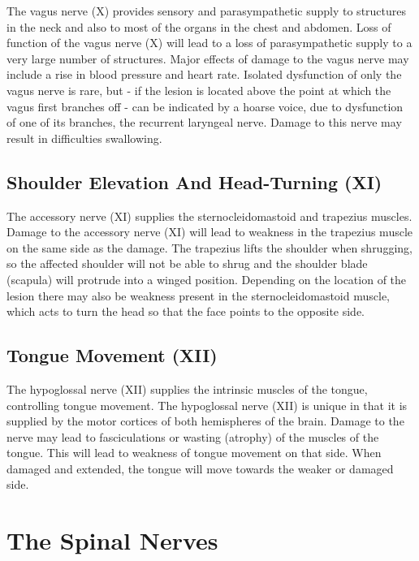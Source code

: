 \documentclass[]{book}
\begin{document}
The vagus nerve (X) provides sensory and parasympathetic supply to structures in the neck and also to most of the organs in the chest and abdomen. Loss of function of the vagus nerve (X) will lead to a loss of parasympathetic supply to a very large number of structures. Major effects of damage to the vagus nerve may include a rise in blood pressure and heart rate. Isolated dysfunction of only the vagus nerve is rare, but - if the lesion is located above the point at which the vagus first branches off - can be indicated by a hoarse voice, due to dysfunction of one of its branches, the recurrent laryngeal nerve. Damage to this nerve may result in difficulties swallowing.

\hypertarget{shoulder-elevation-and-head-turning-xi}{%
\subsection{Shoulder Elevation And Head-Turning (XI)}\label{shoulder-elevation-and-head-turning-xi}}

The accessory nerve (XI) supplies the sternocleidomastoid and trapezius muscles. Damage to the accessory nerve (XI) will lead to weakness in the trapezius muscle on the same side as the damage. The trapezius lifts the shoulder when shrugging, so the affected shoulder will not be able to shrug and the shoulder blade (scapula) will protrude into a winged position. Depending on the location of the lesion there may also be weakness present in the sternocleidomastoid muscle, which acts to turn the head so that the face points to the opposite side.

\hypertarget{tongue-movement-xii}{%
\subsection{Tongue Movement (XII)}\label{tongue-movement-xii}}

The hypoglossal nerve (XII) supplies the intrinsic muscles of the tongue, controlling tongue movement. The hypoglossal nerve (XII) is unique in that it is supplied by the motor cortices of both hemispheres of the brain. Damage to the nerve may lead to fasciculations or wasting (atrophy) of the muscles of the tongue. This will lead to weakness of tongue movement on that side. When damaged and extended, the tongue will move towards the weaker or damaged side.

\hypertarget{the-spinal-nerves}{%
\section{The Spinal Nerves}\label{the-spinal-nerves}}
\end{document}

